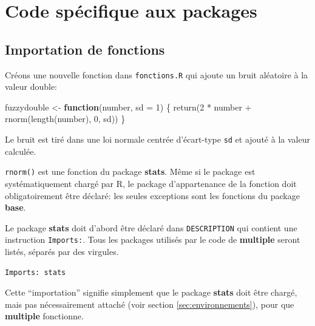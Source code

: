 \documentclass[
  11pt,
  french,
  a4paper,
  extrafontsizes,onecolumn,openright
  ]{memoir}
\newenvironment{Shaded}{\begin{snugshade}}{\end{snugshade}}
\newcommand{\AttributeTok}[1]{\textcolor[rgb]{0.77,0.63,0.00}{#1}}
\newcommand{\ControlFlowTok}[1]{\textcolor[rgb]{0.13,0.29,0.53}{\textbf{#1}}}
\newcommand{\DecValTok}[1]{\textcolor[rgb]{0.00,0.00,0.81}{#1}}
\newcommand{\FunctionTok}[1]{\textcolor[rgb]{0.00,0.00,0.00}{#1}}
\newcommand{\NormalTok}[1]{#1}
\newcommand{\OtherTok}[1]{\textcolor[rgb]{0.56,0.35,0.01}{#1}}
\newcommand{\SpecialCharTok}[1]{\textcolor[rgb]{0.00,0.00,0.00}{#1}}
\begin{document}
\hypertarget{code-spuxe9cifique-aux-packages}{%
\section{Code spécifique aux packages}\label{code-spuxe9cifique-aux-packages}}

\hypertarget{importation-de-fonctions}{%
\subsection{Importation de fonctions}\label{importation-de-fonctions}}

Créons une nouvelle fonction dans \texttt{fonctions.R} qui ajoute un bruit aléatoire à la valeur double:

\scriptsize

\begin{Shaded}
\begin{Highlighting}[]
\NormalTok{fuzzydouble }\OtherTok{\textless{}{-}} \ControlFlowTok{function}\NormalTok{(number, }\AttributeTok{sd =} \DecValTok{1}\NormalTok{) \{}
    \FunctionTok{return}\NormalTok{(}\DecValTok{2} \SpecialCharTok{*}\NormalTok{ number }\SpecialCharTok{+} \FunctionTok{rnorm}\NormalTok{(}\FunctionTok{length}\NormalTok{(number), }\DecValTok{0}\NormalTok{, sd))}
\NormalTok{\}}
\end{Highlighting}
\end{Shaded}

\normalsize

Le bruit est tiré dans une loi normale centrée d'écart-type \texttt{sd} et ajouté à la valeur calculée.

\texttt{rnorm()} est une fonction du package \textbf{stats}.
Même si le package est systématiquement chargé par R, le package d'appartenance de la fonction doit obligatoirement être déclaré: les seules exceptions sont les fonctions du package \textbf{base}.

Le package \textbf{stats} doit d'abord être déclaré dans \texttt{DESCRIPTION} qui contient une instruction \texttt{Imports:}.
Tous les packages utilisés par le code de \textbf{multiple} seront listés, séparés par des virgules.

\begin{verbatim}
Imports: stats
\end{verbatim}

Cette ``importation'' signifie simplement que le package \textbf{stats} doit être chargé, mais pas nécessairement attaché (voir section \ref{sec:environnements}), pour que \textbf{multiple} fonctionne.
\end{document}
